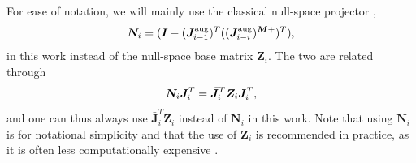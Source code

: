 \documentclass[../main.tex]{subfiles}
\begin{document}
For ease of notation, we will mainly use the classical null-space projector \cite{khatibUnifiedApproachMotion1987},
\begin{equation}
    \bm{N_}{i}=(\bm{I} - (\bm{J_}{i-1}^\mathrm{aug})^T((\bm{J_}{i-i}^\mathrm{aug})^{\bm{M}+})^T),
\end{equation}
in this work instead of the null-space base matrix $\bm{Z}_i$. 
The two are related through
\begin{equation} \label{eq:NandZ}
    \bm{N_}{i}\bm{J_}{i}^T = \bar{\bm{J}}_{i}^T\bm{Z}_{i}\bm{J_}{i}^T,
\end{equation}
and one can thus always use $\bar{\bm{J}}_i^T\bm{Z}_i$ instead of $\bm{N}_i$ in this work.
Note that using $\bm{N}_i$ is for notational simplicity and that the use of $\bm{Z}_i$ is recommended in practice, as it is often less computationally expensive \cite{ottNullspaceStiffness2008}.
\end{document}
